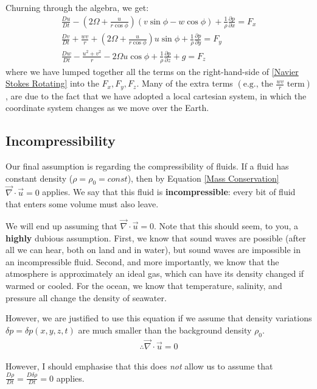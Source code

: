 Churning through the algebra, we get:
\begin{align*}
    \frac{Du}{Dt}-\left( 2\Omega+\frac{u}{r\cos\phi} \right)\left( v\sin\phi-w\cos\phi \right)+\frac{1}{\rho}\frac{\partial p}{\partial x}
    =F_x\\
    \frac{Dv}{Dt}+\frac{wv}{r}+\left( 2\Omega+\frac{u}{r\cos\phi} \right)u\sin\phi+\frac{1}{\rho}\frac{\partial p}{\partial y}=F_y\\
    \frac{Dw}{Dt}-\frac{u^2+v^2}{r}-2\Omega u \cos\phi+\frac{1}{\rho}\frac{\partial p}{\partial z}+g=F_z
\end{align*}
where we have lumped together all the terms on the right-hand-side of \ref{Navier Stokes Rotating} into the $F_x, F_y, F_z$. Many of the extra terms $\left( \text{e.g., the } \frac{wv}{r} \text{ term}\right)$, are due to the fact that we have adopted a local cartesian system, in which the coordinate system changes as we move over the Earth. 

\subsection{Incompressibility}

Our final assumption is regarding the compressibility of fluids. If a fluid has constant density ($\rho=\rho_0=const$), then by Equation \ref{Mass Conservation} $\vec{\nabla}\cdot\vec{u}=0$ applies. We say that this fluid is \textbf{incompressible}: every bit of fluid that enters some volume must also leave.

We will end up assuming that $\vec{\nabla}\cdot\vec{u}=0$. Note that this should seem, to you, a \textbf{highly} dubious assumption. First, we know that sound waves are possible (after all we can hear, both on land and in water), but sound waves are impossible in an incompressible fluid. Second, and more importantly, we know that the atmosphere is approximately an ideal gas, which can have its density changed if warmed or cooled. For the ocean, we know that temperature, salinity, and pressure all change the density of seawater.

However, we are justified to use this equation if we assume that density variations $\delta p = \delta p (x,y,z,t)$ are much smaller than the background density $\rho_0$.
\begin{align}
    \therefore \boxed{\vec{\nabla}\cdot \vec{u}=0}\label{Incompressible}
\end{align}

However, I should emphasise that this does \textit{not} allow us to assume that $\frac{D\rho}{Dt} = \frac{D\delta \rho}{Dt} = 0$ applies.

